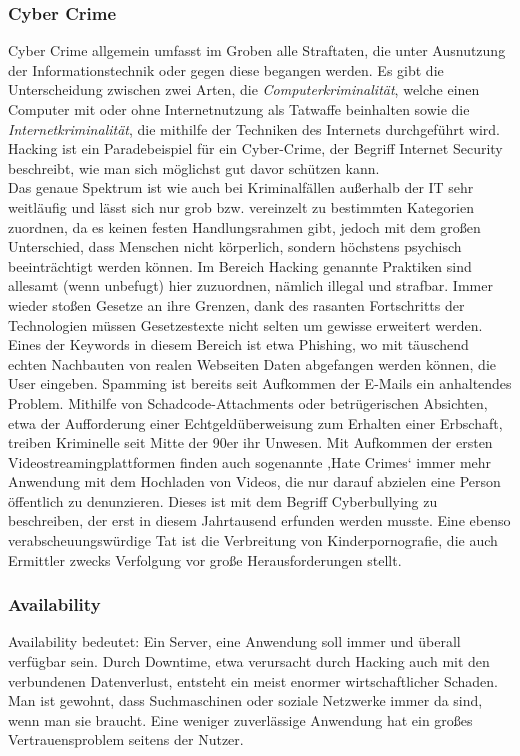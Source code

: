 \documentclass[letterpaper, 12pt]{article}
\let\tempsubsubsection\subsubsection
\renewcommand\subsubsection[1]{\vspace{0cm}\tempsubsubsection{#1}\vspace{0cm}}
\begin{document}
\subsubsection{Cyber Crime}
Cyber Crime allgemein umfasst im Groben alle Straftaten, die unter Ausnutzung der Informationstechnik oder
gegen diese begangen werden. Es gibt die Unterscheidung zwischen zwei Arten, die
\textit{Computerkriminalität}, welche einen Computer mit oder ohne Internetnutzung als Tatwaffe
beinhalten sowie die \textit{Internetkriminalität}, die mithilfe der Techniken des Internets durchgeführt wird.
Hacking ist ein Paradebeispiel für ein Cyber-Crime, der Begriff Internet Security beschreibt, wie man
sich möglichst gut davor schützen kann. \\
Das genaue Spektrum ist wie auch bei Kriminalfällen außerhalb der IT sehr weitläufig und lässt sich
nur grob bzw. vereinzelt zu bestimmten Kategorien zuordnen, da es keinen festen Handlungsrahmen
gibt, jedoch mit dem großen Unterschied, dass Menschen nicht körperlich, sondern höchstens
psychisch beeinträchtigt werden können. Im Bereich Hacking genannte Praktiken sind allesamt
(wenn unbefugt) hier zuzuordnen, nämlich illegal und strafbar. Immer wieder stoßen Gesetze an ihre
Grenzen, dank des rasanten Fortschritts der Technologien müssen Gesetzestexte nicht selten um
gewisse erweitert werden. Eines der Keywords in diesem Bereich ist etwa Phishing, wo mit
täuschend echten Nachbauten von realen Webseiten Daten abgefangen werden können, die User
eingeben. Spamming ist bereits seit Aufkommen der E-Mails ein anhaltendes Problem. Mithilfe von
Schadcode-Attachments oder betrügerischen Absichten, etwa der Aufforderung einer
Echtgeldüberweisung zum Erhalten einer Erbschaft, treiben Kriminelle seit Mitte der 90er ihr
Unwesen. Mit Aufkommen der ersten Videostreamingplattformen finden auch sogenannte ‚Hate
Crimes‘ immer mehr Anwendung mit dem Hochladen von Videos, die nur darauf abzielen eine Person öffentlich zu denunzieren. Dieses ist mit dem Begriff Cyberbullying zu beschreiben, der erst in diesem
Jahrtausend erfunden werden musste. Eine ebenso verabscheuungswürdige Tat ist die Verbreitung
von Kinderpornografie, die auch Ermittler zwecks Verfolgung vor große Herausforderungen stellt. \cite{ausarbeitung}
\subsubsection{Availability}
Availability bedeutet: Ein Server, eine Anwendung soll immer und überall verfügbar sein. Durch Downtime, etwa verursacht durch Hacking  auch mit den verbundenen Datenverlust, entsteht ein meist enormer wirtschaftlicher Schaden. Man ist gewohnt, dass Suchmaschinen oder soziale Netzwerke immer da sind, wenn man sie braucht. Eine weniger zuverlässige Anwendung hat ein großes Vertrauensproblem seitens der Nutzer. \cite{ausarbeitung}
\end{document}
